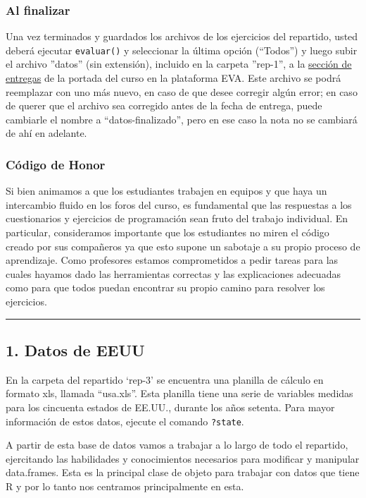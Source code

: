 \documentclass[]{article}
\begin{document}
\subsubsection{Al finalizar}

Una vez terminados y guardados los archivos de los ejercicios del
repartido, usted deberá ejecutar \texttt{evaluar()} y seleccionar la
última opción (``Todos'') y luego subir el archivo ''datos'' (sin
extensión), incluido en la carpeta ''rep-1'', a la
\href{http://eva.universidad.edu.uy/mod/assignment/view.php?id=95125}{sección
de entregas} de la portada del curso en la plataforma EVA. Este archivo
se podrá reemplazar con uno más nuevo, en caso de que desee corregir
algún error; en caso de querer que el archivo sea corregido antes de la
fecha de entrega, puede cambiarle el nombre a ``datos-finalizado'', pero
en ese caso la nota no se cambiará de ahí en adelante.

\subsubsection{Código de Honor}

Si bien animamos a que los estudiantes trabajen en equipos y que haya un
intercambio fluido en los foros del curso, es fundamental que las
respuestas a los cuestionarios y ejercicios de programación sean fruto
del trabajo individual. En particular, consideramos importante que los
estudiantes no miren el código creado por sus compañeros ya que esto
supone un sabotaje a su propio proceso de aprendizaje. Como profesores
estamos comprometidos a pedir tareas para las cuales hayamos dado las
herramientas correctas y las explicaciones adecuadas como para que todos
puedan encontrar su propio camino para resolver los ejercicios.

\begin{center}\rule{3in}{0.4pt}\end{center}

\subsection{1. Datos de EEUU}

En la carpeta del repartido `rep-3' se encuentra una planilla de cálculo
en formato xls, llamada ``usa.xls''. Esta planilla tiene una serie de
variables medidas para los cincuenta estados de EE.UU., durante los años
setenta. Para mayor información de estos datos, ejecute el comando
\texttt{?state}.

A partir de esta base de datos vamos a trabajar a lo largo de todo el
repartido, ejercitando las habilidades y conocimientos necesarios para
modificar y manipular data.frames. Esta es la principal clase de objeto
para trabajar con datos que tiene R y por lo tanto nos centramos
principalmente en esta.
\end{document}
